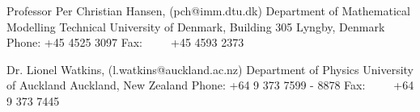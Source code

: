 \documentclass[12pt,a4paper]{article}
\begin{document}

\noindent Professor Per Christian Hansen, (pch@imm.dtu.dk)\newline
Department of Mathematical Modelling \newline
Technical University of Denmark, Building 305  Lyngby, Denmark \newline
Phone: +45 4525 3097 \newline
Fax:\ \ \ \ \  +45 4593 2373\newline



\noindent Dr. Lionel Watkins, (l.watkins@auckland.ac.nz)\newline
Department of Physics\newline
University of Auckland\newline
Auckland, New Zealand\newline
Phone: +64 9 373 7599 - 8878\newline
Fax:\ \ \ \ \  +64 9 373 7445\newline

\end{document}
